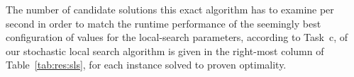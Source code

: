 The number of candidate solutions this exact algorithm has to examine
per second in order to match the runtime performance of the seemingly
best configuration of values for the local-search parameters,
according to Task~c, of our stochastic local search algorithm is given
in the right-most column of Table~\ref{tab:res:sls}, for each instance
solved to proven optimality.
%

